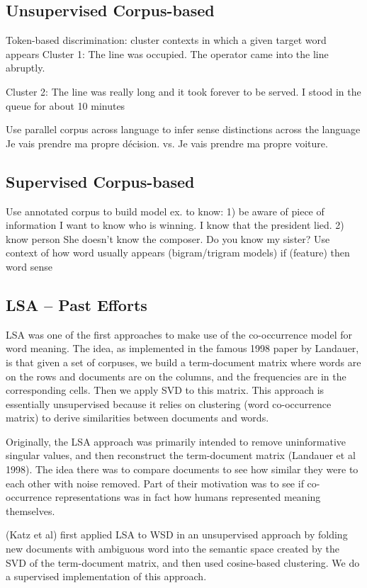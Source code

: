 \documentclass[10pt, letterpaper]{article}
\begin{document}
	\subsection{Unsupervised Corpus-based}
	 Token-based discrimination: cluster contexts in which a given target word appears
	 Cluster 1: The line was occupied. 
	 The operator came into the line abruptly.

	 Cluster 2: The line was really long and it took forever to be served. 
 	 I stood in the queue for about 10 minutes

 	 Use parallel corpus across language to infer sense distinctions across the language
	 Je vais prendre ma propre décision.
	 vs.
	 Je vais prendre ma propre voiture.
	\subsection{Supervised Corpus-based}
	 Use annotated corpus to build model
 	 ex. to know: 1) be aware of piece of information
                              I want to know who is winning.
                              I know that the president lied.
                             2) know person
                             She doesn't know the composer.
                             Do you know my sister?
	 Use context of how word usually appears (bigram/trigram models)
 	 if (feature) then word sense
 	\subsection{LSA -- Past Efforts}
 	LSA was one of the first approaches to make use of the co-occurrence model for word meaning. The idea, as implemented in the famous 1998 paper by Landauer, is that given a set of corpuses, we build a term-document matrix where words are on the rows and documents are on the columns, and the frequencies are in the corresponding cells.
	Then we apply SVD to this matrix. 
	This approach is essentially unsupervised because it relies on clustering (word co-occurrence matrix) to derive similarities between documents and words. 

	Originally, the LSA approach was primarily intended to remove uninformative singular values, and then reconstruct the term-document matrix (Landauer et al 1998).  The idea there was to compare documents to see how similar they were to each other with noise removed. Part of their motivation was to see if co-occurrence representations was in fact how humans represented meaning themselves.

	(Katz et al) first applied LSA to WSD in an unsupervised approach by folding new documents with ambiguous word into the semantic space created by the SVD of the term-document matrix, and then used cosine-based clustering. We do a supervised implementation of this approach. 
\end{document}
